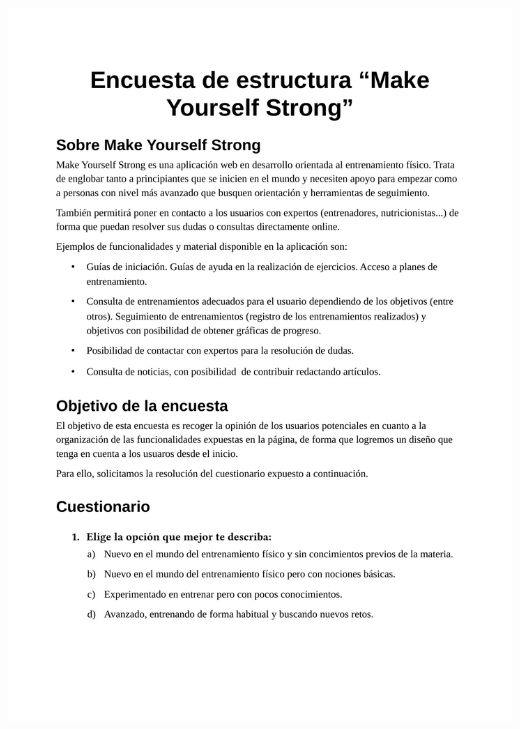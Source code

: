 \documentclass[a4paper]{article}
\begin{document}
 \includegraphics[width=\textwidth, page=2]{./figuras/encuesta.pdf}
\end{document}
